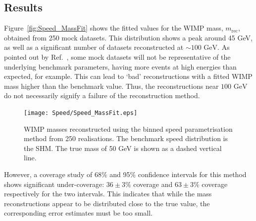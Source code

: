 \subsection{Results}
Figure~\ref{fig:Speed_MassFit} shows the fitted values for the WIMP mass, \(m_\textrm{rec}\), obtained from 250 mock datasets. This distribution shows a peak around 45 GeV, as well as a significant number of datasets reconstructed at \(\sim 100 \textrm{ GeV}\). As pointed out by Ref.\ \cite{Strege:2012}, some mock datasets will not be representative of the underlying benchmark parameters, having more events at high energies than expected, for example. This can lead to `bad' reconstructions with a fitted WIMP mass higher than the benchmark value. Thus, the reconstructions near \(100 \textrm{ GeV}\) do not necessarily signify a failure of the reconstruction method.

 \begin{figure}[t]
\centering
  \texttt{[image: Speed/Speed\_MassFit.eps]}
  \caption[Distribution of reconstructed WIMP masses using the binned speed parametrisation]{WIMP masses reconstructed using the binned speed parametrisation method from 250 realisations. The benchmark speed distribution is the SHM. The true mass of 50 GeV is shown as a dashed vertical line.}
  \label{fig:Speed:Speed_MassFit}
\end{figure}

However, a coverage study of 68\% and 95\% confidence intervals for this method shows significant under-coverage: \(36 \pm 3 \%\) coverage and \(63 \pm 3 \%\) coverage respectively for the two intervals. This indicates that while the mass reconstructions appear to be distributed close to the true value, the corresponding error estimates must be too small. 

